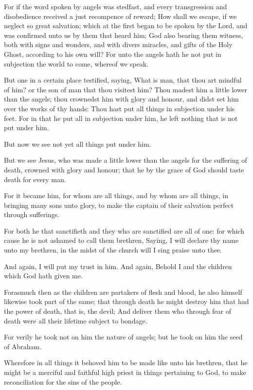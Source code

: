 \verse For if the word spoken by angels was stedfast, and every transgression and disobedience received a just recompence of reward; \verse How shall we escape, if we neglect so great salvation; which at the first began to be spoken by the Lord, and was confirmed unto us by them that heard him; \verse God also bearing them witness, both with signs and wonders, and with divers miracles, and gifts of the Holy Ghost, according to his own will?  \verse For unto the angels hath he not put in subjection the world to come, whereof we speak.

\verse But one in a certain place testified, saying, What is man, that thou art mindful of him? or the son of man that thou visitest him?  \verse Thou madest him a little lower than the angels; thou crownedst him with glory and honour, and didst set him over the works of thy hands: \verse Thou hast put all things in subjection under his feet. For in that he put all in subjection under him, he left nothing that is not put under him.

But now we see not yet all things put under him.

\verse But we see Jesus, who was made a little lower than the angels for the suffering of death, crowned with glory and honour; that he by the grace of God should taste death for every man.

\verse For it became him, for whom are all things, and by whom are all things, in bringing many sons unto glory, to make the captain of their salvation perfect through sufferings.

\verse For both he that sanctifieth and they who are sanctified are all of one: for which cause he is not ashamed to call them brethren, \verse Saying, I will declare thy name unto my brethren, in the midst of the church will I sing praise unto thee.

\verse And again, I will put my trust in him. And again, Behold I and the children which God hath given me.

\verse Forasmuch then as the children are partakers of flesh and blood, he also himself likewise took part of the same; that through death he might destroy him that had the power of death, that is, the devil; \verse And deliver them who through fear of death were all their lifetime subject to bondage.

\verse For verily he took not on him the nature of angels; but he took on him the seed of Abraham.

\verse Wherefore in all things it behoved him to be made like unto his brethren, that he might be a merciful and faithful high priest in things pertaining to God, to make reconciliation for the sins of the people.

